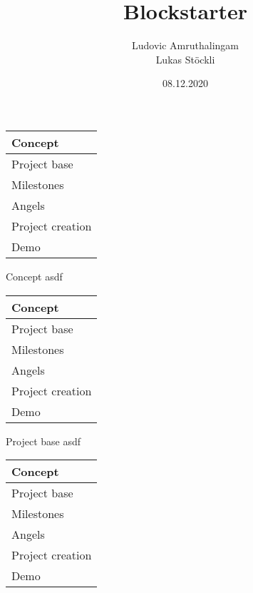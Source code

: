 \documentclass{beamer}
\title              {Blockstarter}
\author             {Ludovic Amruthalingam\\Lukas Stöckli}
\institute          {University of Basel}
\date               {08.12.2020}
\begin{document}
\begin{frame}[t,plain]
	\titlepage
\end{frame}




\begin{frame}
	\begin{tabularx}{\textwidth}{X}
		\hline
		\rowcolor{hcolor}
		Concept\\
		\hline
		Project base\\
		\hline
		Milestones\\
		\hline
		Angels\\
		\hline
		Project creation\\
		\hline
		Demo\\
		\hline
	\end{tabularx}
\end{frame}




\begin{frame}{Concept}
asdf
\end{frame}


\begin{frame}
	\begin{tabularx}{\textwidth}{X}
		\hline
		Concept\\
		\hline
		\rowcolor{hcolor}
		Project base\\
		\hline
		Milestones\\
		\hline
		Angels\\
		\hline
		Project creation\\
		\hline
		Demo\\
		\hline
	\end{tabularx}
\end{frame}


\begin{frame}{Project base}
asdf
\end{frame}


\begin{frame}
	\begin{tabularx}{\textwidth}{X}
		\hline
		Concept\\
		\hline
		Project base\\
		\hline
		\rowcolor{hcolor}
		Milestones\\
		\hline
		Angels\\
		\hline
		Project creation\\
		\hline
		Demo\\
		\hline
	\end{tabularx}
\end{frame}
\end{document}
